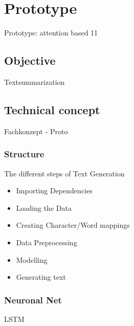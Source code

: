 \chapter{Prototype}\label{ch:proto}

Prototype: attention based 11




%

\section{Objective}

Textsummarization

\section{Technical concept}

Fachkonzept - Proto

\subsection{Structure}

The different steps of Text Generation

\begin{itemize}
\item Importing Dependencies
\item Loading the Data
\item Creating Character/Word mappings
\item Data Preprocessing
\item Modelling
\item Generating text
\end{itemize}

\subsection{Neuronal Net}\label{ss:nn}

LSTM

